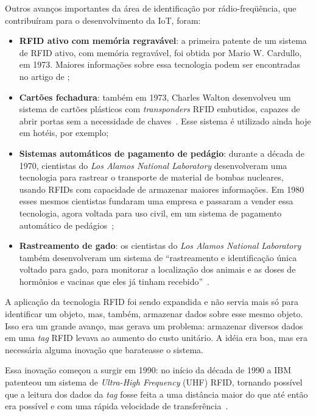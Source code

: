 \documentclass[pdftex, brazil, 12pt, twoside]{article}
\newcommand{\ingles}[1]{\textit{#1}}
\begin{document}
Outros avanços importantes da área de identificação por rádio-freqüência, que
contribuíram para o desenvolvimento da IoT, foram:

\begin{itemize}
\item \textbf{RFID ativo com memória regravável}: a primeira patente de um sistema de RFID ativo,
  com memória regravável, foi obtida por Mario W. Cardullo, em 1973. Maiores informações
  sobre essa tecnologia podem ser encontradas no artigo de \citet{CardulloRFIDGenesis2003};
\item \textbf{Cartões fechadura}: também em 1973, Charles Walton desenvolveu um sistema
  de cartões plásticos com \ingles{transponders} RFID embutidos, capazes de abrir
  portas sem a necessidade de chaves~\citep{IEEEIoTDefinition}. Esse sistema é
  utilizado ainda hoje em hotéis, por exemplo;
\item \textbf{Sistemas automáticos de pagamento de pedágio}: durante a década de 1970,
  cientistas do \emph{Los Alamos National Laboratory} desenvolveram uma tecnologia
  para rastrear o transporte de material de bombas nucleares, usando RFIDs com
  capacidade de armazenar maiores informações. Em 1980 esses mesmos cientistas
  fundaram uma empresa e passaram a vender essa tecnologia, agora voltada
  para uso civil, em um sistema de pagamento automático de pedágios~\citep{IEEEIoTDefinition};
\item \textbf{Rastreamento de gado}: os cientistas do \emph{Los Alamos National Laboratory}
  também desenvolveram um sistema de ``rastreamento e identificação única voltado
  para gado, para monitorar a localização dos animais e as doses de hormônios e
  vacinas que eles já tinham recebido''~\citep[][p.\ 8--9]{IEEEIoTDefinition}.
\end{itemize}

A aplicação da tecnologia RFID foi sendo
expandida e não servia mais só para identificar um objeto, mas, também, armazenar
dados sobre esse mesmo objeto. Isso era um grande avanço, mas gerava um problema:
armazenar diversos dados em uma \ingles{tag} RFID levava ao aumento do custo
unitário. A idéia era boa, mas era necessária alguma inovação que barateasse o
sistema.

Essa inovação começou a surgir em 1990: no início da década de 1990
a IBM patenteou um sistema de \emph{Ultra-High Frequency} (UHF) RFID, tornando
possível que a leitura dos dados da \emph{tag} fosse feita a uma distância maior
do que até então era possível e com uma rápida velocidade de
transferência~\citep{IEEEIoTDefinition}.
\end{document}
